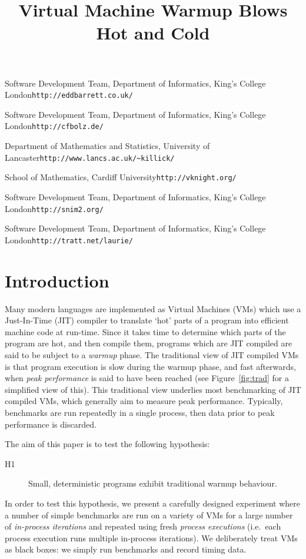 \documentclass[preprint]{sigplanconf}
\newcommand{\hypone}{H1\xspace}
\begin{document}
\title{Virtual Machine Warmup Blows Hot and Cold}

{Software Development Team, Department of Informatics, King's College London}{\texttt{http://eddbarrett.co.uk/}}

{Software Development Team, Department of Informatics, King's College London}{\texttt{http://cfbolz.de/}}

{Department of Mathematics and Statistics, University of Lancaster}{\texttt{http://www.lancs.ac.uk/\~{}killick/}}

{School of Mathematics, Cardiff University}{\texttt{http://vknight.org/}}

{Software Development Team, Department of Informatics, King's College London}{\texttt{http://snim2.org/}}

{Software Development Team, Department of Informatics, King's College London}{\texttt{http://tratt.net/laurie/}}


\maketitle

\section{Introduction}
\label{sec:intro}

Many modern languages are implemented as Virtual Machines (VMs) which use a
Just-In-Time (JIT) compiler to translate `hot' parts of a program into efficient
machine code at run-time. Since it takes time to determine which parts of the
program are hot, and then compile them, programs which are JIT compiled are
said to be subject to a \emph{warmup} phase. The traditional view of
JIT compiled VMs is that program execution is slow during the warmup phase, and
fast afterwards, when \emph{peak performance} is said to have been reached
(see Figure~\ref{fig:trad} for a simplified view of this).
This traditional view underlies most benchmarking of JIT compiled VMs, which
generally aim to measure peak performance.
Typically, benchmarks are run repeatedly in a single process, then data prior
to peak performance is discarded.

The aim of this paper is to test the following hypothesis:
\begin{description}
  \item[\hypone] Small, deterministic programs exhibit traditional warmup behaviour.
\end{description}
In order to test this hypothesis, we present a carefully designed
experiment where a number of simple benchmarks are run on a variety of
VMs for a large number of \emph{in-process iterations} and repeated using fresh
\emph{process executions} (i.e.~each process execution runs multiple in-process
iterations). We deliberately treat VMs as black boxes: we simply run benchmarks
and record timing data.
\end{document}
